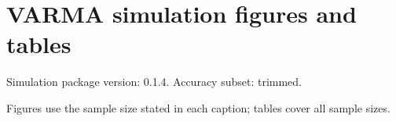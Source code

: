 \documentclass[10pt]{article}
\begin{document}
\section*{VARMA simulation figures and tables}
Simulation package version: 0.1.4. Accuracy subset: trimmed. 
\par\medskip Figures use the sample size stated in each caption; tables cover all sample sizes.
\clearpage
\clearpage
\end{document}
